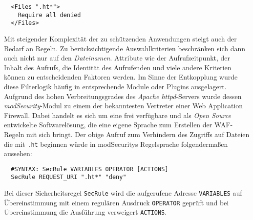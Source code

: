 \begin{lstlisting}
  <Files ".ht*">
    Require all denied
  </Files>
\end{lstlisting}

Mit steigender Komplexität der zu schützenden Anwendungen steigt auch der Bedarf an Regeln. Zu berücksichtigende Auswahlkriterien beschränken sich dann auch nicht nur auf den \glqq\emph{Dateinamen}\grqq. Attribute wie der Aufrufzeitpunkt, der Inhalt des Aufrufs, die Identität des Aufrufenden und viele andere Kriterien können zu entscheidenden Faktoren werden. Im Sinne der Entkopplung wurde diese Filterlogik häufig in entsprechende Module oder Plugins ausgelagert. Aufgrund des hohen Verbreitungsgrades des \emph{Apache httpd}-Servers wurde dessen \emph{modSecurity}-Modul zu einem der bekanntesten Vertreter einer Web Application Firewall. Dabei handelt es sich um eine frei verfügbare und als \emph{Open Source} entwickelte Softwarelösung, die eine eigene Sprache zum Erstellen der WAF-Regeln mit sich bringt. Der obige Aufruf zum Verhindern des Zugriffs auf Dateien die mit \texttt{.ht} beginnen würde in modSecuritys Regelsprache folgendermaßen aussehen:

\begin{lstlisting}
  #SYNTAX: SecRule VARIABLES OPERATOR [ACTIONS]        
  SecRule REQUEST_URI ".ht*" "deny"
\end{lstlisting}

Bei dieser Sicherheitsregel \verb=SecRule= wird die aufgerufene Adresse \verb=VARIABLES= auf Übereinstimmung mit einem regulären Ausdruck \verb=OPERATOR= geprüft und bei Übereinstimmung die Ausführung verweigert \verb=ACTIONS=.

